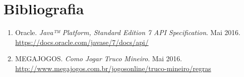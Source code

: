 \documentclass[a4paper,12pt]{article}
\begin{document}
\section{Bibliografia}

\begin{enumerate}
    \item Oracle. \emph{Java™ Platform, Standard Edition 7 API Specification}. Mai 2016. \url{https://docs.oracle.com/javase/7/docs/api/}
    \item MEGAJOGOS. \emph{Como Jogar Truco Mineiro}. Mai 2016. \url{http://www.megajogos.com.br/jogosonline/truco-mineiro/regras}
\end{enumerate}
\end{document}
